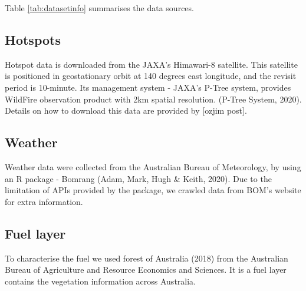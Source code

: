 \documentclass{monashthesis}
\begin{document}
Table \ref{tab:datasetinfo} summarises the data sources.

\subsection{Hotspots}\label{hotspots}

Hotspot data is downloaded from the JAXA's Himawari-8 satellite. This
satellite is positioned in geostationary orbit at 140 degrees east
longitude, and the revisit period is 10-minute. Its management system -
JAXA's P-Tree system, provides WildFire observation product with 2km
spatial resolution. (P-Tree System, 2020). Details on how to download
this data are provided by {[}ozjim post{]}.

\subsection{Weather}\label{weather}

Weather data were collected from the Australian Bureau of Meteorology,
by using an R package - Bomrang (Adam, Mark, Hugh \& Keith, 2020). Due
to the limitation of APIs provided by the package, we crawled data from
BOM's website for extra information.

\subsection{Fuel layer}\label{fuel-layer}

To characterise the fuel we used forest of Australia (2018) from the
Australian Bureau of Agriculture and Resource Economics and Sciences. It
is a fuel layer contains the vegetation information across Australia.
\end{document}
